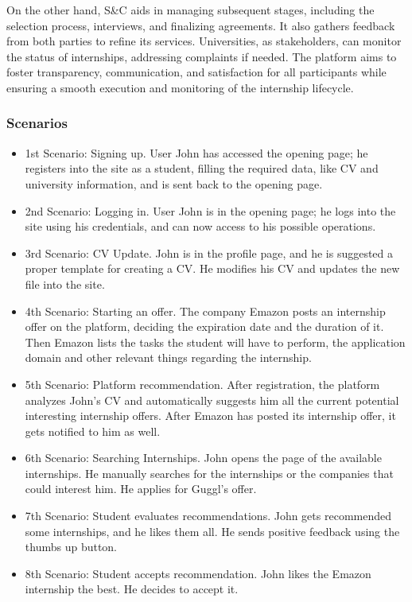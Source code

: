\documentclass[a4paper,12pt]{article}
\begin{document}
On the other hand, S\&C aids in managing subsequent stages, including the selection process, interviews, and finalizing agreements. It also gathers feedback from both parties to refine its services. 
Universities, as stakeholders, can monitor the status of internships, addressing complaints if needed. The platform aims to foster transparency, communication, and satisfaction for all participants while ensuring a smooth execution and monitoring of the internship lifecycle.
\subsubsection{Scenarios}
    \begin{itemize}
        \item 1st Scenario: Signing up. User John has accessed the opening page; he registers into the site as a student, filling the required data, like CV and university information, and is sent back to the opening page.
        \item 2nd Scenario: Logging in. User John is in the opening page; he logs into the site using his credentials, and can now access to his possible operations.
        \item 3rd Scenario: CV Update. John is in the profile page, and he is suggested a proper template for creating a CV. He modifies his CV and updates the new file into the site.
        \item 4th Scenario: Starting an offer. The company Emazon posts an internship offer on the platform, deciding the expiration date and the duration of it. Then Emazon lists the tasks the student will have to perform, the application domain and other relevant things regarding the internship.  
        \item 5th Scenario: Platform recommendation. After registration, the platform analyzes John's CV and automatically suggests him all the current potential interesting internship offers. After Emazon has posted its internship offer, it gets notified to him as well.
        \item 6th Scenario: Searching Internships. John opens the page of the available internships. He manually searches for the internships or the companies that could interest him. He applies for Guggl's offer.
        \item 7th Scenario: Student evaluates recommendations. John gets recommended some internships, and he likes them all. He sends positive feedback using the thumbs up button.
        \item 8th Scenario: Student accepts recommendation. John likes the Emazon internship the best. He decides to accept it.

\end{itemize}
\end{document}
